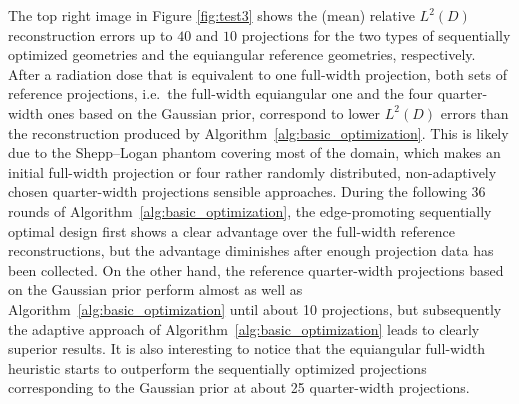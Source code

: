 \documentclass[final]{siamltex}
\begin{document}
The top right image in Figure \ref{fig:test3} shows the (mean) relative $L^2(D)$ reconstruction errors up to $40$ and $10$ projections for the two types of sequentially optimized geometries and the equiangular reference geometries, respectively. After a radiation dose that is equivalent to one full-width projection, both sets of reference projections, i.e.~the full-width equiangular one and the four quarter-width ones based on the Gaussian prior, correspond to lower $L^2(D)$ errors than the reconstruction produced by Algorithm~\ref{alg:basic_optimization}. This is likely due to the Shepp--Logan phantom covering most of the domain, which makes an initial full-width projection or four rather randomly distributed, non-adaptively chosen quarter-width projections sensible approaches. During the following 36 rounds of Algorithm~\ref{alg:basic_optimization}, the edge-promoting sequentially optimal design first shows a clear advantage over the full-width reference reconstructions, but the advantage diminishes after enough projection data has been collected. On the other hand, the reference quarter-width projections based on the Gaussian prior perform almost as well as Algorithm~\ref{alg:basic_optimization} until about 10 projections, but subsequently the adaptive approach of Algorithm~\ref{alg:basic_optimization} leads to clearly superior results. It is also interesting to notice that the equiangular full-width heuristic starts to outperform the sequentially optimized projections corresponding to the Gaussian prior at about 25 quarter-width projections.
\end{document}

